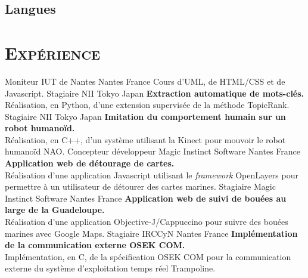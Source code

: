 \documentclass[10pt, a4paper]{moderncv}
\begin{document}
    \subsection{Langues}

  \section{\textsc{Expérience}}
            {Moniteur}                                    %
            {IUT de Nantes}                               %
            {Nantes}                                      %
            {France}                                      %
            {Cours d'UML, de HTML/CSS et de Javascript.}  %
            {Stagiaire}
            {NII}
            {Tokyo}
            {Japan}
            {\textbf{Extraction automatique de mots-clés.}\\
             Réalisation, en Python, d'une extension supervisée de la méthode
             TopicRank.}
            {Stagiaire}
            {NII}
            {Tokyo}
            {Japan}
            {\textbf{Imitation du comportement humain sur un robot humanoïd.}\\
             Réalisation, en C++, d'un système utilisant la Kinect pour mouvoir
             le robot humanoïd NAO.}
            {Concepteur développeur}
            {Magic Instinct Software}
            {Nantes}
            {France}
            {\textbf{Application web de détourage de cartes.}\\
             Réalisation d'une application Javascript utilisant le
             \textit{framework} OpenLayers pour permettre à un utilisateur de
             détourer des cartes marines.}
            {Stagiaire}
            {Magic Instinct Software}
            {Nantes}
            {France}
            {\textbf{Application web de suivi de bouées au large de la
             Guadeloupe.}\\
             Réalisation d'une application Objective-J/Cappuccino pour suivre
             des bouées marines avec Google Maps.}
            {Stagiaire}
            {IRCCyN}
            {Nantes}
            {France}
            {\textbf{Implémentation de la communication externe OSEK COM.}\\
             Implémentation, en C, de la spécification OSEK COM pour la
             communication externe du système d'exploitation temps réel
             Trampoline.}

  
  
  \nocite{*}
\end{document}
